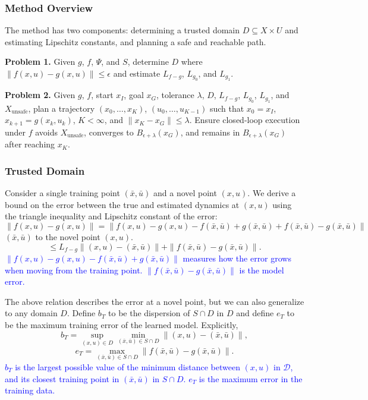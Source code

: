 \documentclass{article}
\begin{document}
\subsubsection{Method Overview}
The method has two components: determining a trusted domain \( D \subseteq X \times U \) and estimating Lipschitz constants, and planning a safe and reachable path.

\textbf{Problem 1.} Given \( g \), \( f \), \( \Psi \), and \( S \), determine \( D \) where \( \|f(x, u) - g(x, u)\| \leq \epsilon \) and estimate \( L_{f-g} \), \( L_{g_0} \), and \( L_{g_1} \).

\textbf{Problem 2.} Given \( g \), \( f \), start \( x_I \), goal \( x_G \), tolerance \( \lambda \), \( D \), \( L_{f-g} \), \( L_{g_0} \), \( L_{g_1} \), and \( X_{\text{unsafe}} \), plan a trajectory \( (x_0, \ldots, x_K) \), \( (u_0, \ldots, u_{K-1}) \) such that \( x_0 = x_I \), \( x_{k+1} = g(x_k, u_k) \), \( K < \infty \), and \( \|x_K - x_G\| \leq \lambda \). Ensure closed-loop execution under \( f \) avoids \( X_{\text{unsafe}} \), converges to \( B_{\epsilon+\lambda}(x_G) \), and remains in \( B_{\epsilon+\lambda}(x_G) \) after reaching \( x_K \).

\subsubsection{Trusted Domain}

Consider a single training point \( (\bar{x}, \bar{u}) \) and a novel point \( (x, u) \). We derive a bound on the error between the true and estimated dynamics at \( (x, u) \) using the triangle inequality and Lipschitz constant of the error:
\[
\|f(x, u) - g(x, u)\| = \|f(x, u) - g(x, u) - f(\bar{x}, \bar{u}) + g(\bar{x}, \bar{u}) + f(\bar{x}, \bar{u}) - g(\bar{x}, \bar{u})\|
\]
\((\bar{x}, \bar{u})\) to the novel point \((x, u)\).
\[
\leq L_{f-g} \|(x, u) - (\bar{x}, \bar{u})\| + \|f(\bar{x}, \bar{u}) - g(\bar{x}, \bar{u})\|.
\]
\textcolor{blue}{\(\|f(x, u) - g(x, u) - f(\bar{x}, \bar{u}) + g(\bar{x}, \bar{u})\|\) measures how the error grows when moving from the training point. \(\|f(\bar{x}, \bar{u}) - g(\bar{x}, \bar{u})\|\) is the model error.}

The above relation describes the error at a novel point, but we can also generalize to any domain \( D \). Define \( b_T \) to be the dispersion of \( S \cap D \) in \( D \) and define \( e_T \) to be the maximum training error of the learned model. Explicitly,
\[
b_T = \sup_{(x,u) \in D} \min_{(\bar{x},\bar{u}) \in S \cap D} \|(x, u) - (\bar{x}, \bar{u})\|,
\]
\[
e_T = \max_{(\bar{x},\bar{u}) \in S \cap D} \|f(\bar{x}, \bar{u}) - g(\bar{x}, \bar{u})\|.
\]
\textcolor{blue}{\(b_{T}\) is the largest possible value of the minimum distance between \( (x,u) \) in \( \mathcal{D} \), and its closest training point in \( (\bar{x},\bar{u}) \) in \( S \cap D \). \(e_{T}\) is the maximum error in the training data.}
\end{document}
